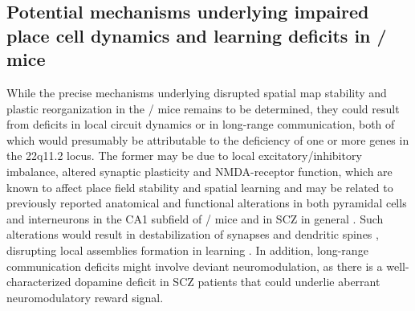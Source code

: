 \subsection{Potential mechanisms underlying impaired place cell dynamics and learning deficits in \df/ mice}

While the precise mechanisms underlying disrupted spatial map stability and plastic reorganization in the \df/ mice remains to be determined, they could result from deficits in local circuit dynamics or in long-range communication, both of which would presumably be attributable to the deficiency of one or more genes in the 22q11.2 locus. The former may be due to local excitatory/inhibitory imbalance, altered synaptic plasticity and NMDA-receptor function, which are known to affect place field stability and spatial learning \citep{Kentros2004, McHugh1996, Tsien1996} and may be related to previously reported anatomical and functional alterations in both pyramidal cells and interneurons in the CA1 subfield of \df/ mice \citep{Drew2011b, Mukai2008} and in SCZ in general \citep{Coyle2012, Crabtree2014}. Such alterations would result in destabilization of synapses and dendritic spines \citep{Fenelon2013, Mukai2015}, disrupting local assemblies formation in learning \citep{Holtmaat2016}. In addition, long-range communication deficits might involve deviant neuromodulation, as there is a well-characterized dopamine deficit in SCZ patients \citep{Howes2009} that could underlie aberrant neuromodulatory reward signal.

